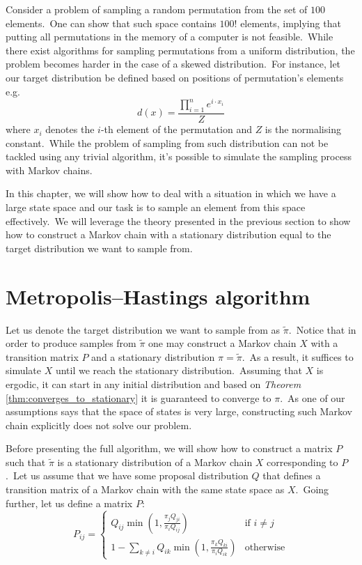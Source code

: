 \documentclass[shortabstract, english, lic]{iithesis}
\theoremstyle{default_theorem_style}\newtheorem{theorem}{Theorem}
\theoremstyle{default_theorem_style}\newtheorem{definition}{Definition}
\begin{document}
Consider a problem of sampling a random permutation from the set of $100$ elements.\ One can show that such space
contains $100!$ elements, implying that putting all permutations in the memory of a computer is not feasible.\ While
there exist algorithms for sampling permutations from a uniform distribution, the problem becomes harder in the case of
a skewed distribution.\ For instance, let our target distribution be defined based on positions of permutation's
elements e.g.
$$
d(x) = \frac{\prod_{i = 1}^{n} e^{i \cdot x_i}}{Z}
$$
where $x_i$ denotes the $i$-th element of the permutation and $Z$ is the normalising constant.\ While the problem
of sampling from such distribution can not be tackled using any trivial algorithm, it's possible to simulate the
sampling process with Markov chains.\newline

\noindent In this chapter, we will show how to deal with a situation in which we have a large state space and our
task is to sample an element from this space effectively.\ We will leverage the theory presented in the previous
section to show how to construct a Markov chain with a stationary distribution equal to the target distribution we
want to sample from.

\section{Metropolis–Hastings algorithm}

Let us denote the target distribution we want to sample from as $\tilde{\pi}$.\ Notice that in order to produce samples
from $\tilde{\pi}$ one may construct a Markov chain $X$ with a transition matrix $P$ and a stationary distribution
$\pi = \tilde{\pi}$.\ As a result, it suffices to simulate $X$ until we reach the stationary distribution.\ Assuming
that $X$ is ergodic, it can start in any initial distribution and based on \textit{Theorem} \ref{thm:converges_to_stationary}
it is guaranteed to converge to $\pi$.\ As one of our assumptions says that the space of states is very large,
constructing such Markov chain explicitly does not solve our problem.\newline

\noindent Before presenting the full algorithm, we will show how to construct a matrix $P$ such that $\tilde{\pi}$ is a
stationary distribution of a Markov chain $X$ corresponding to $P$.\ Let us assume that we have some proposal
distribution $Q$ that defines a transition matrix of a Markov chain with the same state space as $X$.\ Going further,
let us define a matrix $P$:\newline
$$
P_{ij} =
\begin{cases}
  Q_{ij}\min{(1, \frac{\pi_j Q_{ji}}{\pi_i Q_{ij}})} &\text{if $i \ne j$}\\
  1 - \sum\limits_{k \ne i}Q_{ik} \min{(1, \frac{\pi_k Q_{ki}}{\pi_i Q_{ik}})} &\text{otherwise}
\end{cases}
$$
\end{document}
